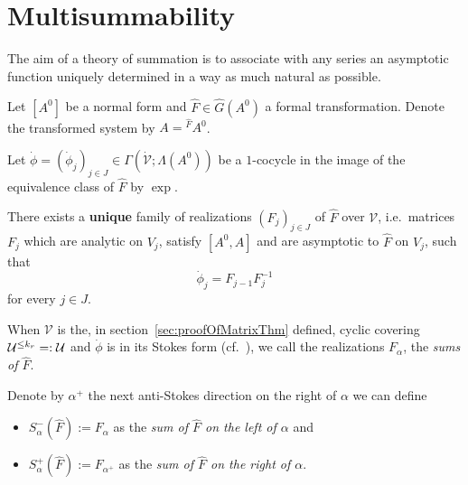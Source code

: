 \chapter{Multisummability}\label{chap:multisummability}
\begin{comment}
  \cite[Sec.III.2]{Loday2014},
  \cite[Chap.6]{Loday2014} and
  \cite[Chap.8]{Loday2014}
\end{comment}
The aim of a theory of summation is  to associate with any series an asymptotic
function uniquely determined in a way as much natural as possible.

Let $[A^0]$ be a normal form and $\hat F\in\hat G(A^0)$ a formal
transformation. Denote the transformed system by $A={}^{\hat F}\!A^0$.

Let $\dot\phi=(\dot\phi_j)_{j\in J}\in\Gamma(\dot{\mathcal{V}};\Lambda(A^0))$
be a $1$-cocycle in the image of the equivalence class of $\hat F$ by $\exp$.
\begin{prop}\label{prop:multisummability}
  There exists a \textbf{unique} family of realizations $(F_j)_{j\in J}$ of
  $\hat F$ over $\mathcal{V}$, i.e.\ matrices $F_j$ which are analytic on
  $V_j$, satisfy $[A^0,A]$ and are asymptotic to $\hat F$ on $V_j$, such that
  \[
    \dot\phi_j=F_{j-1}F_j^{-1}
  \]
  for every $j\in J$.
\end{prop}
When $\mathcal{V}$ is the, in section~\ref{sec:proofOfMatrixThm} defined,
cyclic covering $\mathcal{U}^{\leq k_r}=:\mathcal{U}$ and $\dot\phi$ is in its Stokes form
(cf.\ \TODO{}), we call the realizations $F_{\alpha}$, the
\emph{sums of $\hat F$}.
\begin{defn}\label{defn:sumsLeftRight}
  Denote by $\alpha^+$ the next anti-Stokes direction on the right of $\alpha$
  we can define
  \begin{itemize}
    \item $S_\alpha^-(\hat F):=F_\alpha$ as the \emph{sum of $\hat F$ on the
      left of $\alpha$} and
    \item $S_\alpha^+(\hat F):=F_{\alpha^+}$ as the \emph{sum of $\hat F$ on
      the right of $\alpha$}.
  \end{itemize}
\end{defn}

